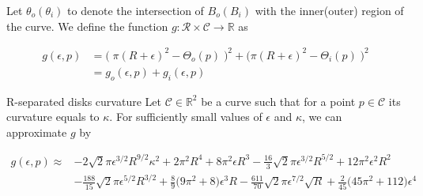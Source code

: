 Let $\theta_o (\theta_i)$ to denote the intersection of $B_o(B_i)$ with the inner(outer) region of the curve. We define the function $g:\mathcal{R} \times \mathcal{C}\rightarrow \mathbb{R}$ as

\begin{align*}
	g(\epsilon,p) &= \Big(\; \pi (R+\epsilon)^2 - \Theta_o(p) \; \Big)^2 + \Big(\pi (R+\epsilon)^2 - \Theta_i(p) \;\Big)^2\\
		 &= g_o(\epsilon,p) + g_i(\epsilon,p)
\end{align*}

\begin{claim}{R-separated disks curvature}\label{claim:r-separated-disks}
 Let $\mathcal{C} \in \mathbb{R}^2$ be a curve such that for a point $p \in \mathcal{C}$ its curvature equals to $\kappa$. For sufficiently small values of $\epsilon$ and $\kappa$, we can approximate $g$ by








\begin{align*}
g(\epsilon,p) \approx & -2\sqrt{2}\pi\epsilon^{3/2}R^{9/2}\kappa^{2} + 2\pi^2R^4 + 8\pi^2\epsilon R^3 - \frac{16}{3}\sqrt{2}\pi \epsilon^{3/2}R^{5/2} + 12\pi^2 \epsilon^2R^2 \\
& - \frac{188}{15}\sqrt{2}\pi \epsilon^{5/2}R^{3/2} + \frac{8}{9}\big(9\pi^2 + 8\big)\epsilon^3 R - \frac{611}{70}\sqrt{2}\pi \epsilon^{7/2}\sqrt{R} + \frac{2}{45}\big( 45\pi^2 + 112\big)\epsilon^4
\end{align*} 
\end{claim}


